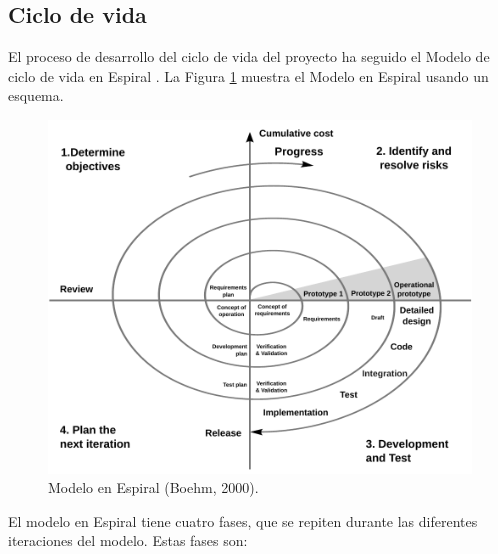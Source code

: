 \subsection{Ciclo de vida}

El proceso de desarrollo del ciclo de vida del proyecto ha seguido el Modelo de ciclo de vida en Espiral \cite{boehm1988}. La Figura \ref{fig:spiral_model} muestra el Modelo en Espiral usando un esquema.

\begin{figure}[htbp]
 	\centering
 	\includegraphics[width=12cm]{figures/spiral_model}
 	\caption{Modelo en Espiral (Boehm, 2000).}
	\label{fig:spiral_model}
\end{figure}

El modelo en Espiral tiene cuatro fases, que se repiten durante las diferentes iteraciones del modelo. Estas fases son:

